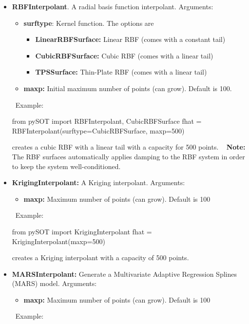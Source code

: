 \documentclass[]{article}
\begin{document}
\begin{itemize}
\item \textbf{RBFInterpolant}. A radial basis function interpolant. Arguments:
\begin{itemize}
\item \textbf{surftype}: Kernel function. The options are 
\begin{itemize}
\item \textbf{LinearRBFSurface:} Linear RBF (comes with a constant tail)
\item \textbf{CubicRBFSurface:} Cubic RBF (comes with a linear tail)
\item \textbf{TPSSurface:} Thin-Plate RBF (comes with a linear tail)
\end{itemize}
\item \textbf{maxp:} Initial maximum number of points (can grow). Default is 100.
\end{itemize}
\ \newline Example:
\begin{python}
from pySOT import RBFInterpolant, CubicRBFSurface
fhat = RBFInterpolant(surftype=CubicRBFSurface, maxp=500)
\end{python}
creates a cubic RBF with a linear tail with a capacity for 500 points.  \newline \ \newline
\textbf{Note:} The RBF surfaces automatically applies damping to the RBF system 
in order to keep the system well-conditioned. 
\item \textbf{KrigingInterpolant:} A Kriging interpolant. Arguments:
\begin{itemize}
\item \textbf{maxp:} Maximum number of points (can grow). Default is 100
\end{itemize}
\ \newline Example:
\begin{python}
from pySOT import KrigingInterpolant
fhat = KrigingInterpolant(maxp=500)
\end{python}
creates a Kriging interpolant with a capacity of 500 points.
\item \textbf{MARSInterpolant:} Generate a Multivariate Adaptive 
Regression Splines (MARS) model. Arguments:
\begin{itemize}
\item \textbf{maxp:} Maximum number of points (can grow). Default is 100
\end{itemize}
\ \newline Example: 
\begin{python}

\end{python}
\end{itemize}
\end{document}

